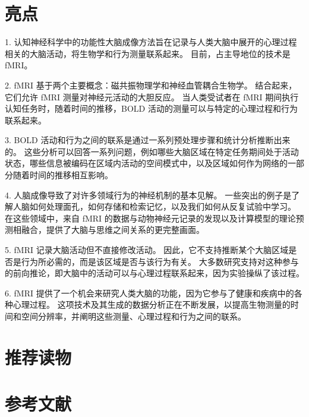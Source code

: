 \section{亮点}

1. 认知神经科学中的功能性大脑成像方法旨在记录与人类大脑中展开的心理过程相关的大脑活动，将生物学和行为测量联系起来。 目前，占主导地位的技术是 fMRI。 

2. fMRI 基于两个主要概念：磁共振物理学和神经血管耦合生物学。 结合起来，它们允许 fMRI 测量对神经元活动的大胆反应。 当人类受试者在 fMRI 期间执行认知任务时，随着时间的推移，BOLD 活动的测量可以与特定的心理过程和行为联系起来。 

3. BOLD 活动和行为之间的联系是通过一系列预处理步骤和统计分析推断出来的。 这些分析可以回答一系列问题，例如哪些大脑区域在特定任务期间处于活动状态，哪些信息被编码在区域内活动的空间模式中，以及区域如何作为网络的一部分随着时间的推移相互影响。 

4. 人脑成像导致了对许多领域行为的神经机制的基本见解。 一些突出的例子是了解人脑如何处理面孔，如何存储和检索记忆，以及我们如何从反复试验中学习。 在这些领域中，来自 fMRI 的数据与动物神经元记录的发现以及计算模型的理论预测相融合，提供了大脑与思维之间关系的更完整画面。 

5. fMRI 记录大脑活动但不直接修改活动。 因此，它不支持推断某个大脑区域是否是行为所必需的，而是该区域是否与该行为有关。 大多数研究支持对这种参与的前向推论，即大脑中的活动可以与心理过程联系起来，因为实验操纵了该过程。 

6. fMRI 提供了一个机会来研究人类大脑的功能，因为它参与了健康和疾病中的各种心理过程。 这项技术及其生成的数据分析正在不断发展，以提高生物测量的时间和空间分辨率，并阐明这些测量、心理过程和行为之间的联系。


\section{推荐读物}

\section{参考文献}
